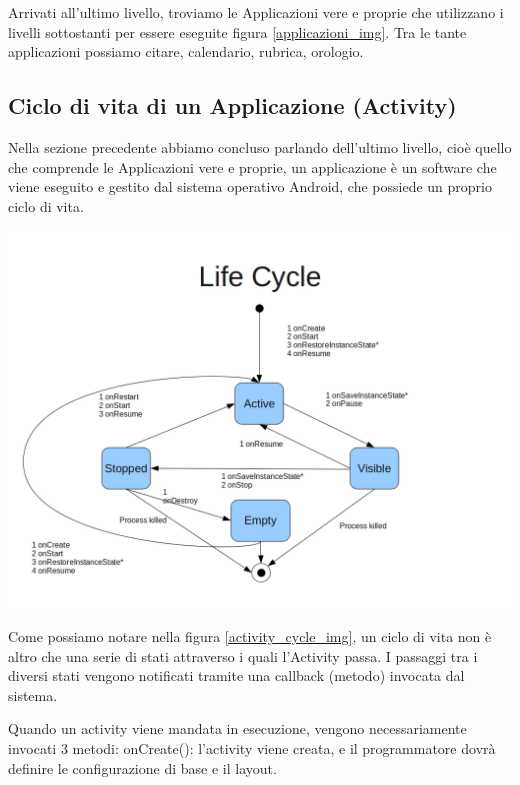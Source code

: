 Arrivati all'ultimo livello, troviamo le Applicazioni vere e proprie che utilizzano i livelli sottostanti per essere eseguite figura \ref{applicazioni_img}.
Tra le tante applicazioni possiamo citare, calendario, rubrica, orologio.

\subsection{Ciclo di vita di un Applicazione (Activity)}

Nella sezione precedente abbiamo concluso parlando dell'ultimo livello, cioè quello che comprende le Applicazioni vere e proprie, un applicazione
è un software che viene eseguito e gestito dal sistema operativo Android, che possiede un proprio ciclo di vita.


\begin{center}
\includegraphics[width=1\textwidth]{imgs/ActivityLifeCycle.jpg}
\label{activity_cycle_img}%
\end{center}

Come possiamo notare nella figura \ref{activity_cycle_img}, un ciclo di vita non è altro che una serie di stati attraverso i quali l'Activity passa.
I passaggi tra i diversi stati vengono notificati tramite una callback (metodo) invocata dal sistema.

Quando un activity viene mandata in esecuzione, vengono necessariamente invocati 3 metodi:
onCreate(): l'activity viene creata, e il programmatore dovrà definire le configurazione di base e il layout.


